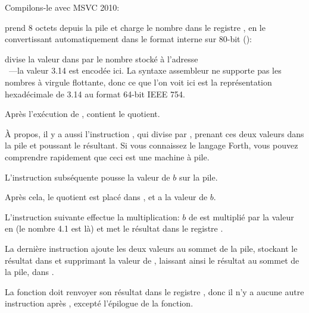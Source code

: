 
Compilons-le avec MSVC 2010:



\FLD prend 8 octets depuis la pile et charge le nombre dans le registre , en
le convertissant automatiquement dans le format interne sur 80-bit ():


\FDIV divise la valeur dans  par le nombre stocké à l'adresse \\
~---la valeur 3.14 est encodée ici.
La syntaxe assembleur ne supporte pas les nombres à virgule flottante, donc ce que
l'on voit ici est la représentation hexadécimale de 3.14 au format 64-bit IEEE 754.

Après l'exécution de \FDIV,  contient le \gls{quotient}.


À propos, il y a aussi l'instruction \FDIVP, qui divise  par , prenant
ces deux valeurs dans la pile et poussant le résultant.
Si vous connaissez le langage Forth\FNURLFORTH, vous pouvez comprendre rapidement
que ceci est une machine à pile\FNURLSTACK.

L'instruction \FLD subséquente pousse la valeur de $b$ sur la pile.

Après cela, le quotient est placé dans , et  a la valeur de $b$.


L'instruction suivante effectue la multiplication: $b$ de  est multiplié par
la valeur en  (le nombre 4.1 est là) et met le résultat
dans le registre .


La dernière instruction \FADDP ajoute les deux valeurs au sommet de la pile, stockant
le résultat dans  et supprimant la valeur de , laissant ainsi le résultat
au sommet de la pile, dans .

La fonction doit renvoyer son résultat dans le registre , donc il n'y a aucune
autre instruction après \FADDP, excepté l'épilogue de la fonction.


